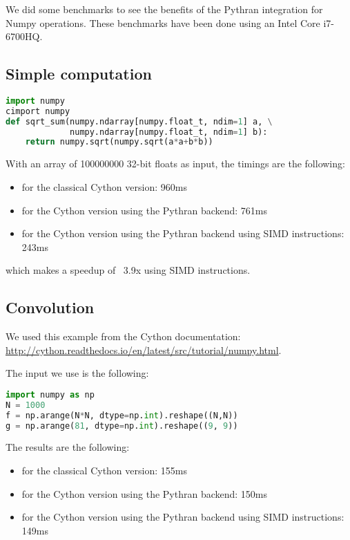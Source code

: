 \documentclass{deliverablereport}
\begin{document}
We did some benchmarks to see the benefits of the Pythran integration for Numpy
operations. These benchmarks have been done using an Intel Core i7-6700HQ.

\subsection{Simple computation}

\begin{lstlisting}[language=python]
import numpy
cimport numpy
def sqrt_sum(numpy.ndarray[numpy.float_t, ndim=1] a, \
             numpy.ndarray[numpy.float_t, ndim=1] b):
    return numpy.sqrt(numpy.sqrt(a*a+b*b))
\end{lstlisting}

With an array of 100000000 32-bit floats as input, the timings are the
following:

\begin{itemize}
  \item for the classical Cython version: 960ms
  \item for the Cython version using the Pythran backend: 761ms
  \item for the Cython version using the Pythran backend using SIMD instructions: 243ms
\end{itemize}

which makes a speedup of ~3.9x using SIMD instructions.

\subsection{Convolution}

We used this example from the Cython documentation:
\url{http://cython.readthedocs.io/en/latest/src/tutorial/numpy.html}.

The input we use is the following:

\begin{lstlisting}[language=python]
import numpy as np
N = 1000
f = np.arange(N*N, dtype=np.int).reshape((N,N))
g = np.arange(81, dtype=np.int).reshape((9, 9))
\end{lstlisting}

The results are the following:

\begin{itemize}
  \item for the classical Cython version: 155ms
  \item for the Cython version using the Pythran backend: 150ms
  \item for the Cython version using the Pythran backend using SIMD instructions: 149ms
\end{itemize}
\end{document}
